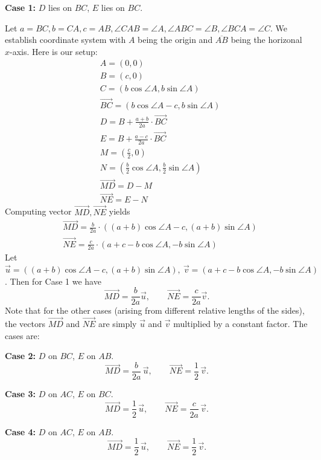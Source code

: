 \begin{enumerate}
 \textbf{Case 1:} $D$ lies on $BC$, $E$ lies on $BC$.

 Let $a=BC,b=CA,c=AB,\angle CAB=\angle A,\angle ABC=\angle B,\angle BCA=\angle C$. We establish coordinate system with $A$ being the origin and $\overline{AB}$ being the horizonal $x$-axis. Here is our setup:\begin{equation*}\begin{aligned}&A=(0,0) \\&B=(c,0) \\&C=(b\cos{\angle A},b\sin{\angle A}) \\&\overrightarrow{BC}=(b\cos{\angle A}-c,b\sin{\angle A}) \\&D=B+\frac{a+b}{2a}\cdot\overrightarrow{BC} \\&E=B+\frac{a-c}{2a}\cdot\overrightarrow{BC} \\&M=(\frac{c}{2},0) \\&N=(\frac{b}{2}\cos{\angle A},\frac{b}{2}\sin{\angle A}) \\&\overrightarrow{MD}=D-M \\&\overrightarrow{NE}=E-N\end{aligned}\end{equation*}Computing vector $\overrightarrow{MD},\overrightarrow{NE}$ yields\begin{equation*}\begin{aligned}&\overrightarrow{MD}=\frac{b}{2a}\cdot((a+b)\cos{\angle A}-c,(a+b)\sin{\angle A})\\&\overrightarrow{NE}=\frac{c}{2a}\cdot(a+c-b\cos{\angle A},-b\sin{\angle A})\end{aligned}\end{equation*}Let $\vec{u}=((a+b)\cos{\angle A}-c,(a+b)\sin{\angle A}),\ \vec{v}=(a+c-b\cos{\angle A},-b\sin{\angle A})$. Then for Case 1 we have
 \[\overrightarrow{MD}=\frac{b}{2a}\vec{u},\qquad\overrightarrow{NE}=\frac{c}{2a}\vec{v}.\]Note that for the other cases (arising from different relative lengths of the sides), the vectors $\overrightarrow{MD}$ and $\overrightarrow{NE}$ are simply $\vec{u}$ and $\vec{v}$ multiplied by a constant factor. The cases are:

 \textbf{Case 2:} $D$ on $BC$, $E$ on $AB$.
 \[\overrightarrow{MD}=\frac{b}{2a}\,\vec{u},\qquad \overrightarrow{NE}=\frac{1}{2}\,\vec{v}.\]

 \textbf{Case 3:} $D$ on $AC$, $E$ on $BC$.
 \[\overrightarrow{MD}=\frac{1}{2}\,\vec{u},\qquad \overrightarrow{NE}=\frac{c}{2a}\,\vec{v}.\]

 \textbf{Case 4:} $D$ on $AC$, $E$ on $AB$.
 \[\overrightarrow{MD}=\frac{1}{2}\,\vec{u},\qquad \overrightarrow{NE}=\frac{1}{2}\,\vec{v}.\]


\end{enumerate}
